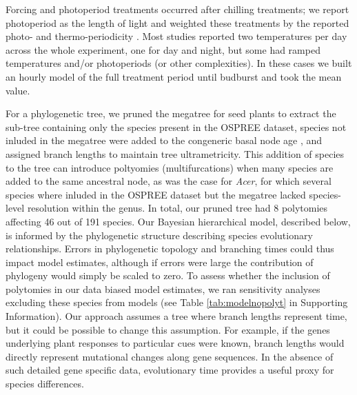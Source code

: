 \documentclass[11pt]{article}
\begin{document}
Forcing and photoperiod treatments occurred after chilling treatments; we report photoperiod as the length of light and weighted these treatments by the reported photo- and thermo-periodicity \citep{buonaiuto2023experimental}. Most studies reported two temperatures per day across the whole experiment, one for day and night, but some had ramped temperatures and/or photoperiods (or other complexities). In these cases we built an hourly model of the full treatment period until budburst and took the mean value. %

For a phylogenetic tree, we pruned the megatree for seed plants \citep{smith2018constructing} to extract the sub-tree containing only the species present in the OSPREE dataset, species not inluded in the megatree were added to the congeneric basal node age \citep[using the function `congeneric.merge' in][]{pearse2015pez}, and assigned branch lengths to maintain tree ultrametricity. This addition of species to the tree can introduce poltyomies (multifurcations) when many species are added to the same ancestral node, as was the case for \emph{Acer}, for which several species where inluded in the OSPREE dataset but the megatree lacked species-level resolution within the genus. In total, our pruned tree had 8 polytomies affecting 46 out of 191 species. Our Bayesian hierarchical model, described below, is informed by the phylogenetic structure describing species evolutionary relationships. Errors in phylogenetic topology and branching times could thus impact model estimates, although if errors were large the contribution of phylogeny would simply be scaled to zero. To assess whether the inclusion of polytomies in our data biased model estimates, we ran sensitivity analyses excluding these species from models (see Table \ref{tab:modelnopolyt} in Supporting Information). Our approach assumes a tree where branch lengths represent time, but it could be possible to change this assumption. For example, if the genes underlying plant responses to particular cues were known, branch lengths would directly represent mutational changes along gene sequences. In the absence of such detailed gene specific data, evolutionary time provides a useful proxy for species differences.\\ 
\end{document}
